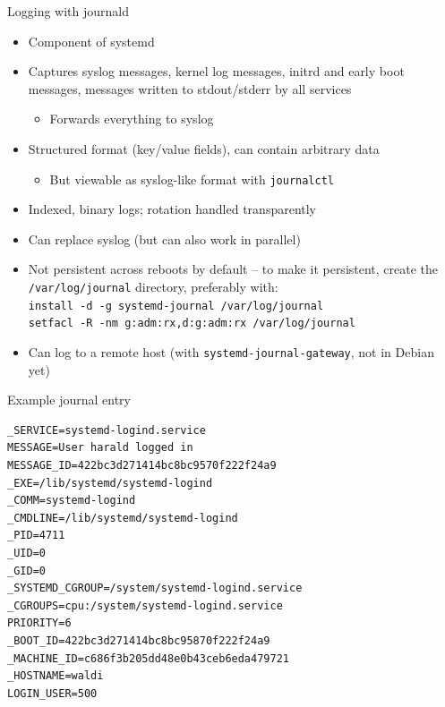 \documentclass[11pt,final,usepdftitle=false]{beamer}
\begin{document}
\begin{frame}{Logging with journald}
\begin{itemize}
\item Component of systemd
\hbr
\item Captures syslog messages, kernel log messages, initrd and early boot messages, messages written to stdout/stderr by all services
	\begin{itemize}
		\item \alert{Forwards everything to syslog}
	\end{itemize}
\hbr
\item \alert{Structured format} (key/value fields), can contain \alert{arbitrary data}
\begin{itemize}
	\item But viewable as syslog-like format with \alert{\texttt{journalctl}}
\end{itemize}
\hbr
\item Indexed, binary logs; rotation handled transparently
\hbr
\item Can replace syslog (but can also work in parallel)
\hbr
\item Not persistent across reboots by default -- to make it persistent, create the
	\texttt{/var/log/journal} directory, preferably with:\\
	\texttt{install -d -g systemd-journal /var/log/journal}\\
	\texttt{setfacl -R -nm g:adm:rx,d:g:adm:rx /var/log/journal}
\hbr
\item Can log to a remote host (with \texttt{systemd-journal-gateway}, not in Debian yet)
\end{itemize}
\end{frame}

\begin{frame}[fragile]{Example journal entry}
\begin{lstlisting}[basicstyle=\ttfamily\small]
_SERVICE=systemd-logind.service
MESSAGE=User harald logged in
MESSAGE_ID=422bc3d271414bc8bc9570f222f24a9
_EXE=/lib/systemd/systemd-logind
_COMM=systemd-logind
_CMDLINE=/lib/systemd/systemd-logind
_PID=4711
_UID=0
_GID=0
_SYSTEMD_CGROUP=/system/systemd-logind.service
_CGROUPS=cpu:/system/systemd-logind.service
PRIORITY=6
_BOOT_ID=422bc3d271414bc8bc95870f222f24a9
_MACHINE_ID=c686f3b205dd48e0b43ceb6eda479721
_HOSTNAME=waldi
LOGIN_USER=500
\end{lstlisting}
\end{frame}
\end{document}
